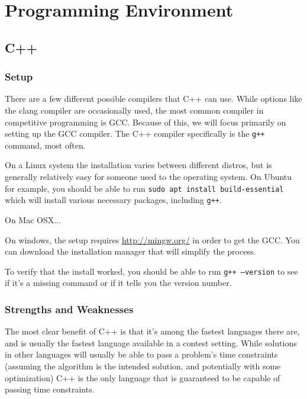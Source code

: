 \section{Programming Environment}



\subsection{C++}

\subsubsection{Setup}

There are a few different possible compilers that C++ can use. While options like the clang compiler are occasionally used, the most common compiler in competitive programming is GCC. Because of this, we will focus primarily on setting up the GCC compiler. The C++ compiler specifically is the \texttt{g++} command, most often.

On a Linux system the installation varies between different distros, but is generally relatively easy for someone used to the operating system. On Ubuntu for example, you should be able to run \texttt{sudo apt install build-essential} which will install various necessary packages, including \texttt{g++}.

On Mac OSX...

On windows, the setup requires \url{http://mingw.org/} in order to get the GCC. You can download the installation manager that will simplify the process.

To verify that the install worked, you should be able to run \texttt{g++ --version} to see if it's a missing command or if it tells you the version number.

\subsubsection{Strengths and Weaknesses}

The most clear benefit of C++ is that it's among the fastest languages there are, and is usually the fastest language available in a contest setting. While solutions in other languages will usually be able to pass a problem's time constraints (assuming the algorithm is the intended solution, and potentially with some optimization) C++ is the only language that is guaranteed to be capable of passing time constraints.

